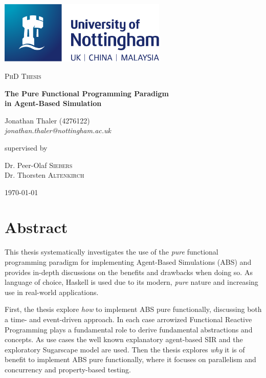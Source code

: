 \documentclass[oneside]{book}
\begin{document}
\begin{titlepage}
	\centering
	\includegraphics[width=0.60\textwidth]{./logo/UoN_Primary_Logo_RGB.png}\par\vspace{1cm}
	{\scshape\Large PhD Thesis\par}
	\vspace{1.5cm}
	{\huge\bfseries The Pure Functional Programming Paradigm \\ in Agent-Based Simulation \par}
	\vspace{2cm}
	{\Large Jonathan Thaler (4276122) \\ \itshape jonathan.thaler@nottingham.ac.uk \par}
	\vfill
	supervised by\par
	Dr. Peer-Olaf \textsc{Siebers} \\
	Dr. Thorsten \textsc{Altenkirch}

	\vfill

	{\large \today\par}
\end{titlepage}

\cleardoublepage

\section*{Abstract}
This thesis systematically investigates the use of the \textit{pure} functional programming paradigm for implementing Agent-Based Simulations (ABS) and provides in-depth discussions on the benefits and drawbacks when doing so. As language of choice, Haskell is used due to its modern, \textit{pure} nature and increasing use in real-world applications.

First, the thesis explore \textit{how} to implement ABS pure functionally, discussing both a time- and event-driven approach. In each case arrowized Functional Reactive Programming plays a fundamental role to derive fundamental abstractions and concepts. As use cases the well known explanatory agent-based SIR and the exploratory Sugarscape model are used. Then the thesis explores \textit{why} it is of benefit to implement ABS pure functionally, where it focuses on parallelism and concurrency and property-based testing. 
\end{document}
